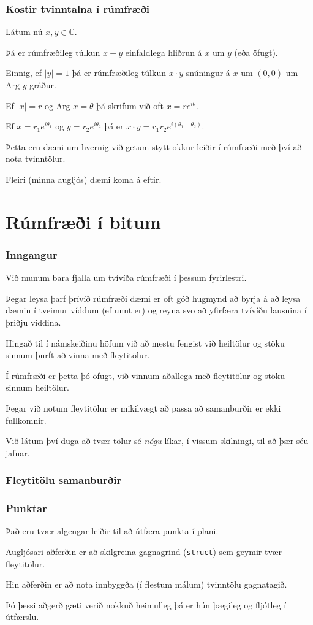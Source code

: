 {
	\frametitle{Kostir tvinntalna í rúmfræði}
	{
		\item<1-> Látum nú $x, y \in \mathbb{C}$.
		\item<2-> Þá er rúmfræðileg túlkun $x + y$ einfaldlega hliðrun á $x$ um $y$ (eða öfugt).
		\item<3-> Einnig, ef $|y| = 1$ þá er rúmfræðileg túlkun $x \cdot y$ snúningur á $x$ um $(0, 0)$ um $\text{Arg } y$ gráður.
		\item<4-> Ef $|x| = r$ og $\text{Arg } x = \theta$ þá skrifum við oft $x = re^{i\theta}$.
		\item<5-> Ef $x = r_1e^{i\theta_1}$ og $y = r_2e^{i\theta_2}$ þá er $x \cdot y = r_1r_2e^{i(\theta_1 + \theta_2)}$.
		\item<6-> Þetta eru dæmi um hvernig við getum stytt okkur leiðir í rúmfræði með því að nota tvinntölur.
		\item<7-> Fleiri (minna augljós) dæmi koma á eftir.
	}
}

\section[Rúmfræði í bitum]{Rúmfræði í bitum}

{
	\frametitle{Inngangur}
	{
		\item<1-> Við munum bara fjalla um tvívíða rúmfræði í þessum fyrirlestri.
		\item<2-> Þegar leysa þarf þrívíð rúmfræði dæmi er oft góð hugmynd að byrja
			á að leysa dæmin í tveimur víddum (ef unnt er) og reyna svo að yfirfæra
			tvívíðu lausnina í þriðju víddina.
		\item<3-> Hingað til í námskeiðinu höfum við að mestu fengist við heiltölur
			og stöku sinnum þurft að vinna með fleytitölur.
		\item<4-> Í rúmfræði er þetta þó öfugt, við vinnum aðallega með fleytitölur og
			stöku sinnum heiltölur.
		\item<5-> Þegar við notum fleytitölur er mikilvægt að passa að samanburðir er
			ekki fullkomnir.
		\item<6-> Við látum því duga að tvær tölur sé \emph{nógu} líkar, í vissum skilningi, til að þær séu jafnar.
	}
}

{
	\frametitle{Fleytitölu samanburðir}
}

{
	\frametitle{Punktar}
	{
		\item<1-> Það eru tvær algengar leiðir til að útfæra punkta í plani.
		\item<2-> Augljósari aðferðin er að skilgreina gagnagrind (\texttt{struct}) sem geymir
			tvær fleytitölur.
		\item<3-> Hin aðferðin er að nota innbyggða (í flestum málum) tvinntölu gagnatagið.
		\item<4-> Þó þessi aðgerð gæti verið nokkuð heimulleg þá er hún þægileg og fljótleg í útfærslu.
	}
}

